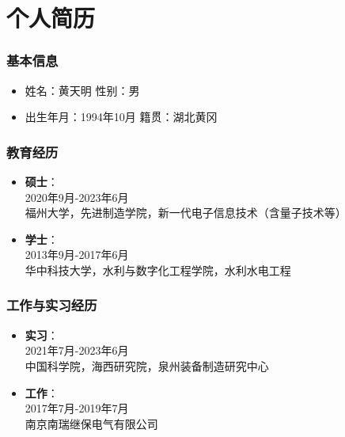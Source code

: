 \chapter{个人简历}

\subsection*{基本信息}
\begin{itemize}
  \item[] 姓\texorpdfstring{\qquad}{}名：黄天明 \hspace{12em}性\texorpdfstring{\qquad}{}别：男
  \item[] 出生年月：1994年10月     \hspace{9em}     籍\texorpdfstring{\qquad}{}贯：湖北黄冈
\end{itemize}






\subsection*{教育经历}

\begin{itemize}
  \item[] \textbf{硕士}：\\
  2020年9月-2023年6月\\
  福州大学，先进制造学院，新一代电子信息技术（含量子技术等）            
  \item[] \textbf{学士}：\\
  2013年9月-2017年6月\\
  华中科技大学，水利与数字化工程学院，水利水电工程
\end{itemize}

\subsection*{工作与实习经历}

\begin{itemize}
  \item[] \textbf{实习}：\\
  2021年7月-2023年6月\\
  中国科学院，海西研究院，泉州装备制造研究中心             
  \item[] \textbf{工作}：\\
  2017年7月-2019年7月\\
  南京南瑞继保电气有限公司 
\end{itemize}